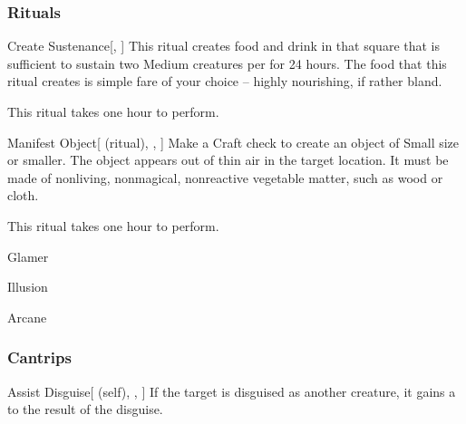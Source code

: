 \subsubsection{Rituals}


\lowercase{\hypertarget{spell:Create Sustenance}{}}\label{spell:Create Sustenance}
\begin{apability}[\nth{2}]{\hypertarget{spell:Create Sustenance}{Create Sustenance}}[, ]
This ritual creates food and drink in that square that is sufficient to sustain two Medium creatures per  for 24 hours.
The food that this ritual creates is simple fare of your choice -- highly nourishing, if rather bland.

This ritual takes one hour to perform.
\end{apability}
\vspace{0.25em}



\lowercase{\hypertarget{spell:Manifest Object}{}}\label{spell:Manifest Object}
\begin{attuneability}[\nth{2}]{\hypertarget{spell:Manifest Object}{Manifest Object}}[ (ritual), , ]
Make a Craft check to create an object of Small size or smaller.
The object appears out of thin air in the target location.
It must be made of nonliving, nonmagical, nonreactive vegetable matter, such as wood or cloth.

This ritual takes one hour to perform.
\end{attuneability}
\vspace{0.25em}


\newpage
\begin{spellsection}{Glamer}

\begin{spellheader}
\end{spellheader}


 Illusion

 Arcane

\subsubsection{Cantrips}


\begin{attuneability}{Assist Disguise}[ (self), , ]
If the target is disguised as another creature, it gains a   to the result of the disguise.
\end{attuneability}

\end{spellsection}


